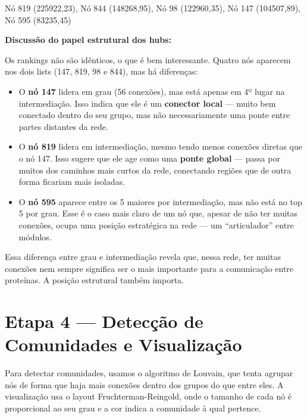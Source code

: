 \documentclass[12pt,a4paper]{article}
\begin{document}
\begin{center}
Nó 819 (225922,23), Nó 844 (148268,95), Nó 98 (122960,35), Nó 147 (104507,89), Nó 595 (83235,45)
\end{center}

\textbf{Discussão do papel estrutural dos hubs:}

Os rankings não são idênticos, o que é bem interessante. Quatro nós aparecem nos dois lists (147, 819, 98 e 844), mas há diferenças:

\begin{itemize}
    \item O \textbf{nó 147} lidera em grau (56 conexões), mas está apenas em 4º lugar na intermediação. Isso indica que ele é um \textbf{conector local} — muito bem conectado dentro do seu grupo, mas não necessariamente uma ponte entre partes distantes da rede.

    \item O \textbf{nó 819} lidera em intermediação, mesmo tendo menos conexões diretas que o nó 147. Isso sugere que ele age como uma \textbf{ponte global} — passa por muitos dos caminhos mais curtos da rede, conectando regiões que de outra forma ficariam mais isoladas.

    \item O \textbf{nó 595} aparece entre os 5 maiores por intermediação, mas não está no top 5 por grau. Esse é o caso mais claro de um nó que, apesar de não ter muitas conexões, ocupa uma posição estratégica na rede — um ``articulador'' entre módulos.
\end{itemize}

Essa diferença entre grau e intermediação revela que, nessa rede, ter muitas conexões nem sempre significa ser o mais importante para a comunicação entre proteínas. A posição estrutural também importa.

\section{Etapa 4 — Detecção de Comunidades e Visualização}

Para detectar comunidades, usamos o algoritmo de Louvain, que tenta agrupar nós de forma que haja mais conexões dentro dos grupos do que entre eles. A visualização usa o layout Fruchterman-Reingold, onde o tamanho de cada nó é proporcional ao seu grau e a cor indica a comunidade à qual pertence.
\end{document}
